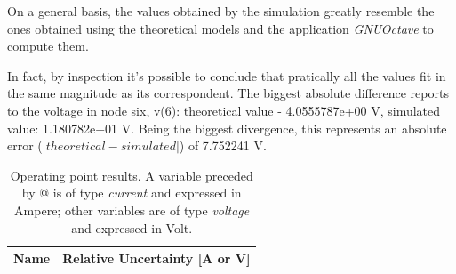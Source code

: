 On a general basis, the values obtained by the simulation greatly resemble the ones obtained using the theoretical models and the application \textit{GNUOctave} to compute them.

In fact, by inspection it's possible to conclude that pratically all the values fit in the same magnitude as its correspondent. The biggest absolute difference reports to the voltage in node six, v(6): theoretical value - 4.0555787e+00 V, simulated value: 1.180782e+01 V. Being the biggest divergence, this represents an absolute error ($|theoretical - simulated|$) of 7.752241 V.

\begin{table}[htb!]
  \centering
  \begin{tabular}{|l|r|}
    \hline    
    {\bf Name} & {\bf Relative Uncertainty [A or V]} \\ \hline
    
  \end{tabular}
  \caption{Operating point results. A variable preceded by @ is of type {\em current}
    and expressed in Ampere; other variables are of type {\it voltage} and expressed in
    Volt.}
  \label{tab:errors}
\end{table}

